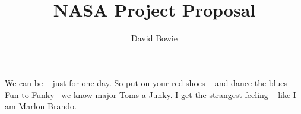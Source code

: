 \documentclass[12pt,twoside]{article}
\title{\textbf{\doctitle}\\
NASA Project Proposal}
\author{David Bowie}
\begin{document}
\thispagestyle{empty}

\maketitle

We can be ~\cite{Heroes,Changes} just for one day.
So put on your red shoes ~\cite{Dance} and dance the blues
Fun to Funky~\cite{Ashes} we know major Toms a Junky.
I get the strangest feeling ~\cite{China} like I am Marlon Brando.


\end{document}
